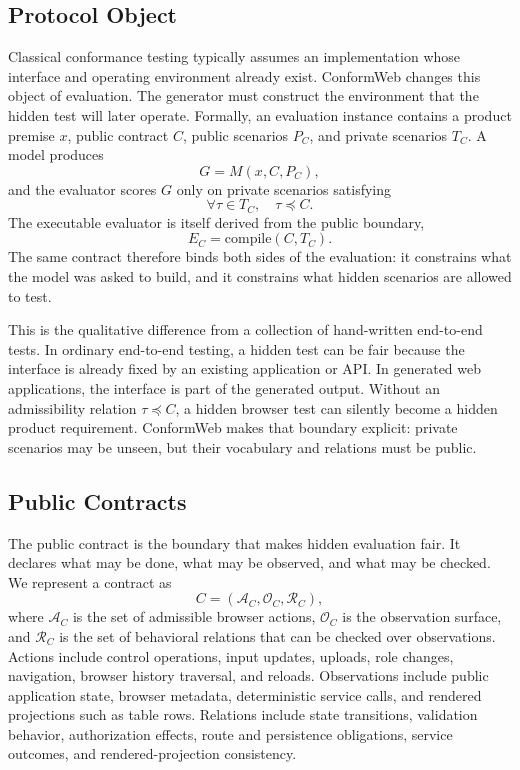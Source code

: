 \subsection{Protocol Object}
\label{sec:protocol-object}

Classical conformance testing typically assumes an implementation whose
interface and operating environment already exist. ConformWeb changes this
object of evaluation. The generator must construct the environment that the
hidden test will later operate. Formally, an evaluation instance contains a
product premise \(x\), public contract \(C\), public scenarios \(P_C\), and
private scenarios \(T_C\). A model produces
\begin{equation}
G = M(x,C,P_C),
\end{equation}
and the evaluator scores \(G\) only on private scenarios satisfying
\begin{equation}
\forall \tau\in T_C,\quad \tau \preceq C .
\end{equation}
The executable evaluator is itself derived from the public boundary,
\begin{equation}
E_C = \mathrm{compile}(C,T_C).
\end{equation}
The same contract therefore binds both sides of the evaluation: it constrains
what the model was asked to build, and it constrains what hidden scenarios are
allowed to test.

This is the qualitative difference from a collection of hand-written end-to-end
tests. In ordinary end-to-end testing, a hidden test can be fair because the
interface is already fixed by an existing application or API. In generated web
applications, the interface is part of the generated output. Without an
admissibility relation \(\tau\preceq C\), a hidden browser test can silently
become a hidden product requirement. ConformWeb makes that boundary explicit:
private scenarios may be unseen, but their vocabulary and relations must be
public.

\subsection{Public Contracts}
\label{sec:contracts}

The public contract is the boundary that makes hidden evaluation fair. It
declares what may be done, what may be observed, and what may be checked. We
represent a contract as
\begin{equation}
C=(\mathcal{A}_C,\mathcal{O}_C,\mathcal{R}_C),
\end{equation}
where \(\mathcal{A}_C\) is the set of admissible browser actions,
\(\mathcal{O}_C\) is the observation surface, and \(\mathcal{R}_C\) is the set
of behavioral relations that can be checked over observations. Actions include
control operations, input updates, uploads, role changes, navigation, browser
history traversal, and reloads. Observations include public application state,
browser metadata, deterministic service calls, and rendered projections such
as table rows. Relations include state transitions, validation behavior,
authorization effects, route and persistence obligations, service outcomes, and
rendered-projection consistency.

